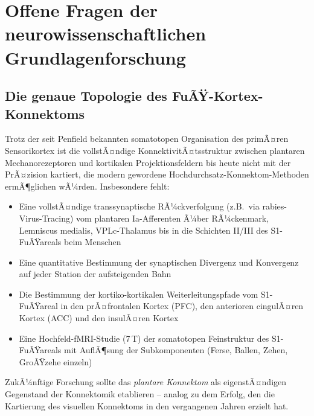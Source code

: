 ﻿\documentclass[12pt,a4paper]{report}
\theoremstyle{plain}
\theoremstyle{definition}
\theoremstyle{remark}
\begin{document}
\section{Offene Fragen der neurowissenschaftlichen Grundlagenforschung}

\subsection{Die genaue Topologie des FuÃŸ-Kortex-Konnektoms}

Trotz der seit Penfield bekannten somatotopen Organisation des primÃ¤ren
Sensorikortex ist die vollstÃ¤ndige KonnektivitÃ¤tsstruktur zwischen
plantaren Mechanore\-zeptoren und kortikalen Projektionsfeldern bis heute
nicht mit der PrÃ¤zision kartiert, die modern gewordene
Hochdurchsatz-Konnektom-Methoden ermÃ¶glichen wÃ¼rden. Insbesondere fehlt:

\begin{itemize}
\item Eine vollstÃ¤ndige transsynaptische RÃ¼ckverfolgung (z.B.\ via
  rabies-Virus-Tracing) vom plantaren Ia-Afferenten Ã¼ber RÃ¼ckenmark,
  Lemniscus medialis, VPLc-Thalamus bis in die Schichten II/III des
  S1-FuÃŸareals beim Menschen
\item Eine quantitative Bestimmung der synaptischen Divergenz und
  Konvergenz auf jeder Station der aufsteigenden Bahn
\item Die Bestimmung der kortiko-kortikalen Weiterleitungspfade vom
  S1-FuÃŸareal in den prÃ¤frontalen Kortex (PFC), den anterioren
  cingulÃ¤ren Kortex (ACC) und den insulÃ¤ren Kortex
\item Eine Hochfeld-fMRI-Studie (7\,T) der somatotopen
  Feinstruktur des S1-FuÃŸareals mit AuflÃ¶sung der Subkomponenten
  (Ferse, Ballen, Zehen, GroÃŸzehe einzeln)
\end{itemize}

ZukÃ¼nftige Forschung sollte das \emph{plantare Konnektom} als eigenstÃ¤ndigen
Gegenstand der Konnektomik etablieren -- analog zu dem Erfolg, den die
Kartierung des visuellen Konnektoms in den vergangenen Jahren erzielt hat.
\end{document}
